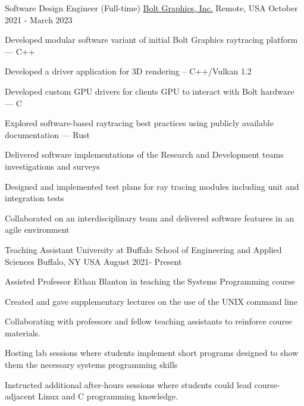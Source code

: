 \begin{cventries}
  \cventry
    {Software Design Engineer (Full-time)} %
    {\href{https://www.bolt.graphics/}{Bolt Graphics, Inc.} } %
    {Remote, USA} %
    {October 2021 - March 2023} %
    {
      \begin{cvitems} %
        \item Developed modular software variant of initial Bolt Graphics raytracing platform --- C++
        \item Developed a driver application for 3D rendering -- C++/Vulkan 1.2
	\item Developed custom GPU drivers for clients GPU to interact with Bolt hardware --- C
        \item Explored software-based raytracing best practices using publicly available documentation --- Rust
        \item Delivered software implementations of the Research and Development teams investigations and surveys
        \item Designed and implemented test plans for ray tracing modules including unit and integration tests
        \item Collaborated on an interdisciplinary team and delivered software features in an agile environment 
      \end{cvitems}
    }
  \cventry
    {Teaching Assistant} %
    {University at Buffalo School of Engineering and Applied Sciences} %
    {Buffalo, NY USA} %
    {August 2021- Present} %
    {
      \begin{cvitems} %
        \item Assisted Professor Ethan Blanton in teaching the Systems Programming course
	\item Created and gave supplementary lectures on the use of the UNIX command line
        \item Collaborating with professors and fellow teaching assistants to reinforce course materials.
        \item Hosting lab sessions where students implement short programs designed to show them the necessary systems programming skills
        \item Instructed additional after-hours sessions where students could lead course-adjacent Linux and C programming knowledge.
      \end{cvitems}
    }


\end{cventries}
